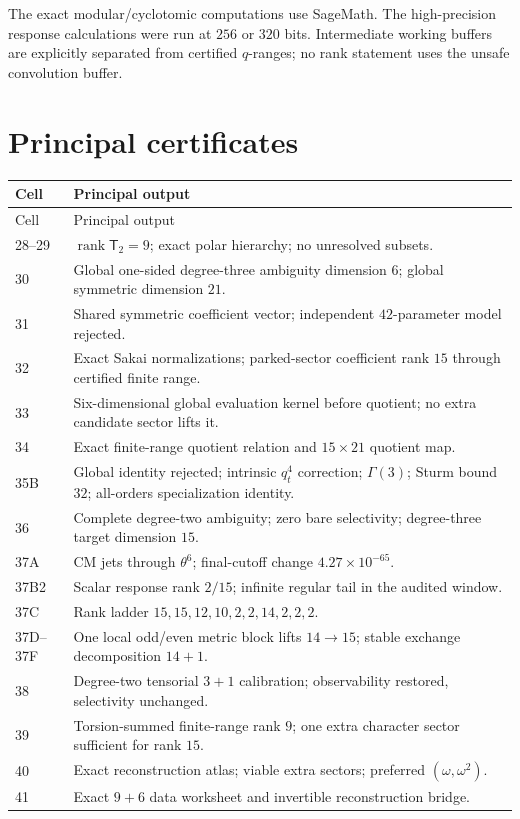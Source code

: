 \documentclass[11pt]{article}
\theoremstyle{definition}
\theoremstyle{remark}
\newcommand{\rank}{\operatorname{rank}}
\begin{document}
The exact modular/cyclotomic computations use SageMath.  The high-precision response calculations were run at $256$ or $320$ bits.  Intermediate working buffers are explicitly separated from certified $q$-ranges; no rank statement uses the unsafe convolution buffer.

\appendix

\section{Principal certificates}

\begin{longtable}{p{}p{}}
\toprule
Cell & Principal output \\
\midrule
\endfirsthead
\toprule
Cell & Principal output \\
\midrule
\endhead
28--29 & $\rank\mathsf T_2=9$; exact polar hierarchy; no unresolved subsets.\\
30 & Global one-sided degree-three ambiguity dimension $6$; global symmetric dimension $21$.\\
31 & Shared symmetric coefficient vector; independent $42$-parameter model rejected.\\
32 & Exact Sakai normalizations; parked-sector coefficient rank $15$ through certified finite range.\\
33 & Six-dimensional global evaluation kernel before quotient; no extra candidate sector lifts it.\\
34 & Exact finite-range quotient relation and $15\times21$ quotient map.\\
35B & Global identity rejected; intrinsic $q_t^4$ correction; $\Gamma(3)$; Sturm bound $32$; all-orders specialization identity.\\
36 & Complete degree-two ambiguity; zero bare selectivity; degree-three target dimension $15$.\\
37A & CM jets through $\theta^6$; final-cutoff change $4.27\times10^{-65}$.\\
37B2 & Scalar response rank $2/15$; infinite regular tail in the audited window.\\
37C & Rank ladder $15,15,12,10,2,2,14,2,2,2$.\\
37D--37F & One local odd/even metric block lifts $14\to15$; stable exchange decomposition $14+1$.\\
38 & Degree-two tensorial $3+1$ calibration; observability restored, selectivity unchanged.\\
39 & Torsion-summed finite-range rank $9$; one extra character sector sufficient for rank $15$.\\
40 & Exact reconstruction atlas; viable extra sectors; preferred $(\omega,\omega^2)$.\\
41 & Exact $9+6$ data worksheet and invertible reconstruction bridge.\\
\bottomrule
\end{longtable}
\end{document}
